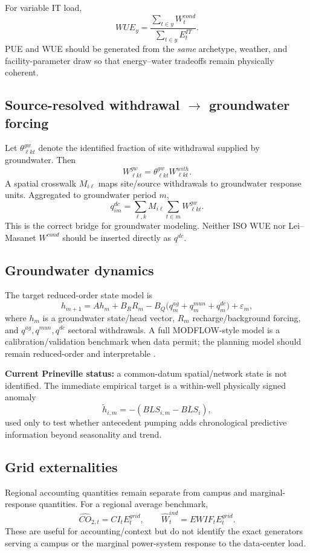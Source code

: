 \documentclass[11pt]{article}
\begin{document}
For variable IT load,
\[
\boxed{WUE_y=\frac{\sum_{t\in y}W^{cond}_t}{\sum_{t\in y}E^{IT}_t}.}
\]
PUE and WUE should be generated from the \emph{same} archetype, weather, and facility-parameter draw so that energy--water tradeoffs remain physically coherent.

\subsection{Source-resolved withdrawal $\rightarrow$ groundwater forcing}

Let $\theta^{gw}_{\ell k t}$ denote the identified fraction of site withdrawal supplied by groundwater. Then
\[
W^{gw}_{\ell k t}=\theta^{gw}_{\ell k t}W^{with}_{\ell k t}.
\]
A spatial crosswalk $M_{i\ell}$ maps site/source withdrawals to groundwater response units. Aggregated to groundwater period $m$,
\[
\boxed{q^{dc}_{im}
=\sum_{\ell,k}M_{i\ell}\sum_{t\in m}W^{gw}_{\ell k t}.}
\]
This is the correct bridge for groundwater modeling. Neither ISO WUE nor Lei--Masanet $W^{cond}$ should be inserted directly as $q^{dc}$.

\subsection{Groundwater dynamics}

The target reduced-order state model is
\[
\boxed{h_{m+1}
=A h_m+B_RR_m-B_Q\bigl(q^{ag}_m+q^{mun}_m+q^{dc}_m\bigr)+\varepsilon_m,}
\]
where $h_m$ is a groundwater state/head vector, $R_m$ recharge/background forcing, and $q^{ag},q^{mun},q^{dc}$ sectoral withdrawals. A full MODFLOW-style model is a calibration/validation benchmark when data permit; the planning model should remain reduced-order and interpretable \cite{modflow,harou}.

\textbf{Current Prineville status:} a common-datum spatial/network state is not identified. The immediate empirical target is a within-well physically signed anomaly
\[
\tilde h_{i,m}=-(BLS_{i,m}-\overline{BLS}_i),
\]
used only to test whether antecedent pumping adds chronological predictive information beyond seasonality and trend.

\subsection{Grid externalities}

Regional accounting quantities remain separate from campus and marginal-response quantities. For a regional average benchmark,
\[
\widehat{CO}_{2,t}=CI_tE^{grid}_t,\qquad
\widehat W^{ind}_t=EWIF_tE^{grid}_t.
\]
These are useful for accounting/context but do not identify the exact generators serving a campus or the marginal power-system response to the data-center load.
\end{document}
